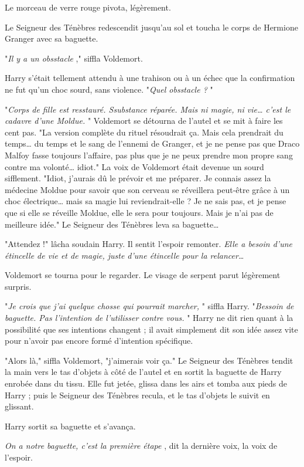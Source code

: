 Le morceau de verre rouge pivota, légèrement.

Le Seigneur des Ténèbres redescendit jusqu'au sol et toucha le corps de Hermione Granger avec sa baguette.

"\emph{Il y a un obsstacle} ," siffla Voldemort.

Harry s'était tellement attendu à une trahison ou à un échec que la confirmation ne fut qu'un choc sourd, sans violence. "\emph{Quel obsstacle ?} "

"\emph{Corps de fille est resstauré. Ssubstance réparée. Mais ni magie, ni vie… c'est le cadavre d'une Moldue.} " Voldemort se détourna de l'autel et se mit à faire les cent pas. "La version complète du rituel résoudrait ça. Mais cela prendrait du temps… du temps et le sang de l'ennemi de Granger, et je ne pense pas que Draco Malfoy fasse toujours l'affaire, pas plus que je ne peux prendre mon propre sang contre ma volonté… idiot." La voix de Voldemort était devenue un sourd sifflement. "Idiot, j'aurais dû le prévoir et me préparer. Je connais assez la médecine Moldue pour savoir que son cerveau se réveillera peut-être grâce à un choc électrique… mais sa magie lui reviendrait-elle ? Je ne sais pas, et je pense que si elle se réveille Moldue, elle le sera pour toujours. Mais je n'ai pas de meilleure idée." Le Seigneur des Ténèbres leva sa baguette…

"Attendez !" lâcha soudain Harry. Il sentit l'espoir remonter. \emph{Elle a besoin d'une étincelle de vie et de magie, juste d'une étincelle pour la relancer…} 

Voldemort se tourna pour le regarder. Le visage de serpent parut légèrement surpris.

"\emph{Je crois que j'ai quelque chosse qui pourrait marcher,} " siffla Harry. "\emph{Bessoin de baguette. Pas l'intention de l'utilisser contre vous.} " Harry ne dit rien quant à la possibilité que ses intentions changent ; il avait simplement dit son idée assez vite pour n'avoir pas encore formé d'intention spécifique.

"Alors là," siffla Voldemort, "j'aimerais voir ça." Le Seigneur des Ténèbres tendit la main vers le tas d'objets à côté de l'autel et en sortit la baguette de Harry enrobée dans du tissu. Elle fut jetée, glissa dans les airs et tomba aux pieds de Harry ; puis le Seigneur des Ténèbres recula, et le tas d'objets le suivit en glissant.

Harry sortit sa baguette et s'avança.

\emph{On a notre baguette, c'est la première étape} , dit la dernière voix, la voix de l'espoir.

